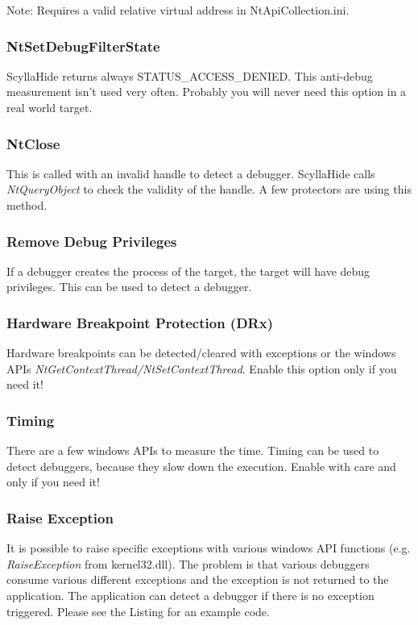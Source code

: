 \documentclass[10pt,a4paper]{article}
\begin{document}
Note: Requires a valid relative virtual address in NtApiCollection.ini.

\subsubsection{NtSetDebugFilterState}
ScyllaHide returns always STATUS\_ACCESS\_DENIED. This anti-debug measurement isn't used very often. Probably you will never need this option in a real world target.

\subsubsection{NtClose}
This is called with an invalid handle to detect a debugger. ScyllaHide calls \textit{NtQueryObject} to check the validity of the handle. A few protectors are using this method.

\subsubsection{Remove Debug Privileges}
If a debugger creates the process of the target, the target will have debug privileges. This can be used to detect a debugger.

\subsubsection{Hardware Breakpoint Protection (DRx)}
Hardware breakpoints can be detected/cleared with exceptions or the windows APIs \textit{NtGetContextThread/NtSetContextThread}. Enable this option only if you need it!

\subsubsection{Timing}
There are a few windows APIs to measure the time. Timing can be used to detect debuggers, because they slow down the execution. Enable with care and only if you need it!

\subsubsection{Raise Exception}
It is possible to raise specific exceptions with various windows API functions (e.g. \textit{RaiseException} from kernel32.dll). The problem is that various debuggers consume various different exceptions and the exception is not returned to the application. The application can detect a debugger if there is no exception triggered. Please see the Listing for an example code.
\end{document}
